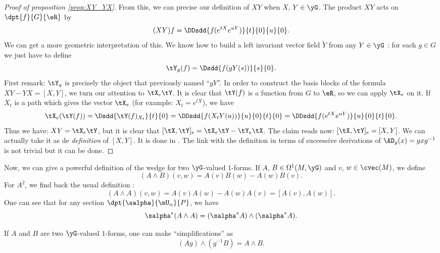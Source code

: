 \begin{proof}[Proof of proposition \ref{prop:XY_YX}] \label{pg_demXY_YX}
From this, we can precise our definition of $XY$ when $X$, $Y\in\yG$. The product $XY$ acts on $\dpt{f}{G}{\eR}$ by
\[
  (XY)f=\DDsdd{f(e^{tX}e^{uY})}{t}{0}{u}{0}.
\]
We can get a more geometric interpretation of this. We know how to build a left invariant vector field $\tilde Y$ from any $Y\in\yG$ : for each $g\in G$ we just have to define
\[
  \tY_g(f)=\Dsdd{f(gY(s))}{s}{0}.
\]
%
First remark: $\tY_g$ is precisely the object that previously named ``$gY$''. In order to construct the basis blocks of the formula $XY-YX=[X,Y]$, we turn our attention to $\tX_e\tY$. It is clear that $\tY(f)$ is a function from $G$ to $\eR$, so we can apply $\tX_e$ on it. If $X_t$ is a path which gives the vector $\tX_e$ (for example: $X_t=e^{tX}$), we have
\begin{equation}
  \tX_e(\tY(f))=\Dsdd{\tY(f)_{X_t}}{t}{0}\\
               =\DDsdd{f(X_tY(u))}{u}{0}{t}{0}\\
	       =\DDsdd{f(e^{tX}e^{uY})}{u}{0}{t}{0}.
\end{equation}
Thus we have: $XY=\tX_e\tY$, but it is clear that $[\tX,\tY]_e=\tX_e\tY-\tY_e\tX$. The claim reads now: $[\tX,\tY]_e=[X,Y]$. We can actually take it as de \emph{definition} of $[X,Y]$. It is done in \cite{Helgason}. The link with the definition in terms of successive derivations of $\AD_g(x)=gxg^{-1}$ is not trivial but it can be done. 
\end{proof}

Now, we can give a powerful definition of the wedge for two $\yG$-valued $1$-forms. If $A$, $B\in\Omega^1(M,\yG)$ and $v$, $w\in\cvec(M)$, we define
\begin{equation}
  (A\wedge B)(v,w)=A(v)B(w)-A(w)B(v).
\end{equation}
For $A^2$, we find back the usual definition :
\[
  (A\wedge A)(v,w)=A(v)A(w)-A(w)A(v)=[A(v),A(w)].
\]
%
One can see that for any section $\dpt{\salpha}{\mU_{\alpha}}{P}$, we have
\begin{equation}\label{eq:1907r2}
   \salpha^*(A\wedge A)=(\salpha^*A)\wedge(\salpha^*A).
\end{equation}


\begin{lemma}
If $A$ and $B$ are two $\yG$-valued $1$-forms, one can make  ``simplifications'' as
\begin{equation}
 (Ag)\wedge(g^{-1} B)=A\wedge B.
\end{equation}
\label{lem:simplif}
\end{lemma}


